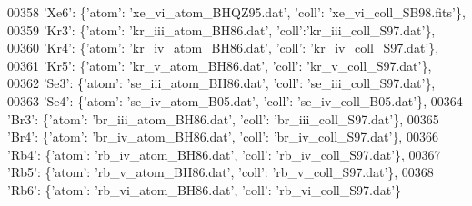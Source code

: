 \begin{DoxyCode}
00358                              \textcolor{stringliteral}{'Xe6'}: \{\textcolor{stringliteral}{'atom'}: \textcolor{stringliteral}{'xe\_vi\_atom\_BHQZ95.dat'}, \textcolor{stringliteral}{'coll'}: \textcolor{stringliteral}{'xe\_vi\_coll\_SB98.fits'}\},
00359                              \textcolor{stringliteral}{'Kr3'}: \{\textcolor{stringliteral}{'atom'}: \textcolor{stringliteral}{'kr\_iii\_atom\_BH86.dat'}, \textcolor{stringliteral}{'coll'}:\textcolor{stringliteral}{'kr\_iii\_coll\_S97.dat'}\},
00360                              \textcolor{stringliteral}{'Kr4'}: \{\textcolor{stringliteral}{'atom'}: \textcolor{stringliteral}{'kr\_iv\_atom\_BH86.dat'}, \textcolor{stringliteral}{'coll'}: \textcolor{stringliteral}{'kr\_iv\_coll\_S97.dat'}\},
00361                              \textcolor{stringliteral}{'Kr5'}: \{\textcolor{stringliteral}{'atom'}: \textcolor{stringliteral}{'kr\_v\_atom\_BH86.dat'}, \textcolor{stringliteral}{'coll'}: \textcolor{stringliteral}{'kr\_v\_coll\_S97.dat'}\},
00362                              \textcolor{stringliteral}{'Se3'}: \{\textcolor{stringliteral}{'atom'}: \textcolor{stringliteral}{'se\_iii\_atom\_BH86.dat'}, \textcolor{stringliteral}{'coll'}: \textcolor{stringliteral}{'se\_iii\_coll\_S97.dat'}\},
00363                              \textcolor{stringliteral}{'Se4'}: \{\textcolor{stringliteral}{'atom'}: \textcolor{stringliteral}{'se\_iv\_atom\_B05.dat'}, \textcolor{stringliteral}{'coll'}: \textcolor{stringliteral}{'se\_iv\_coll\_B05.dat'}\},
00364                              \textcolor{stringliteral}{'Br3'}: \{\textcolor{stringliteral}{'atom'}: \textcolor{stringliteral}{'br\_iii\_atom\_BH86.dat'}, \textcolor{stringliteral}{'coll'}: \textcolor{stringliteral}{'br\_iii\_coll\_S97.dat'}\},
00365                              \textcolor{stringliteral}{'Br4'}: \{\textcolor{stringliteral}{'atom'}: \textcolor{stringliteral}{'br\_iv\_atom\_BH86.dat'}, \textcolor{stringliteral}{'coll'}: \textcolor{stringliteral}{'br\_iv\_coll\_S97.dat'}\},
00366                              \textcolor{stringliteral}{'Rb4'}: \{\textcolor{stringliteral}{'atom'}: \textcolor{stringliteral}{'rb\_iv\_atom\_BH86.dat'}, \textcolor{stringliteral}{'coll'}: \textcolor{stringliteral}{'rb\_iv\_coll\_S97.dat'}\},
00367                              \textcolor{stringliteral}{'Rb5'}: \{\textcolor{stringliteral}{'atom'}: \textcolor{stringliteral}{'rb\_v\_atom\_BH86.dat'}, \textcolor{stringliteral}{'coll'}: \textcolor{stringliteral}{'rb\_v\_coll\_S97.dat'}\},
00368                              \textcolor{stringliteral}{'Rb6'}: \{\textcolor{stringliteral}{'atom'}: \textcolor{stringliteral}{'rb\_vi\_atom\_BH86.dat'}, \textcolor{stringliteral}{'coll'}: \textcolor{stringliteral}{'rb\_vi\_coll\_S97.dat'}\}

\end{DoxyCode}
